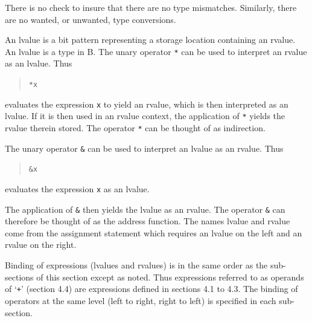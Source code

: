 \documentclass[12pt]{report}
\begin{document}
There is no check to insure that there are no type mismatches.
Similarly, there are no wanted, or unwanted, type conversions.

An lvalue is a bit pattern representing a storage location containing
an rvalue.  An lvalue is a type in B. The unary operator \verb|*| can
be used to interpret an rvalue as an lvalue. Thus
\begin{quote}
  \verb|*x|
\end{quote}
evaluates the expression \verb|x| to yield an rvalue, which is then
interpreted as an lvalue.  If it is then used in an rvalue context,
the application of \verb|*| yields the rvalue therein stored.  The
operator \verb|*| can be thought of as indirection.

The unary operator \verb|&| can be used to interpret an lvalue as an
rvalue. Thus
\begin{quote}
  \verb|&x|
\end{quote}
evaluates the expression \verb|x| as an lvalue.

The application of \verb|&| then yields the lvalue as an rvalue.  The
operator \verb|&| can therefore be thought of as the address function.
The names lvalue and rvalue come from the assignment statement which
requires an lvalue on the left and an rvalue on the right.


Binding of expressions (lvalues and rvalues) is in the same order as
the sub-sections of this section except as noted.  Thus expressions
referred to as operands of `\verb|+|' (section 4.4) are expressions
defined in sections 4.1 to 4.3. The binding of operators at the same
level (left to right, right to left) is specified in each sub-section.
\end{document}
